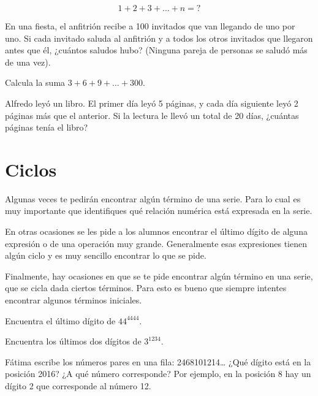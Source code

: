 \[
1+2+3+\dots+n = ?
\]

\begin{exercise}
    En una fiesta, el anfitrión recibe a 100 invitados que van 
    llegando de uno por uno. Si cada invitado saluda al anfitrión 
    y a todos los otros invitados que llegaron antes que él, 
    ¿cuántos saludos hubo? (Ninguna pareja de personas se saludó 
    más de una vez).
\end{exercise}

\begin{exercise}
    Calcula la suma \(3 + 6 + 9 + \dots + 300\).
\end{exercise}

\begin{exercise}
    Alfredo leyó un libro. El primer día leyó 5 páginas, y cada 
    día siguiente leyó 2 páginas más que el anterior. Si la 
    lectura le llevó un total de 20 días, 
    ¿cuántas páginas tenía el libro?
\end{exercise}

\section{Ciclos}

Algunas veces te pedirán encontrar algún término de una serie. Para lo cual es muy importante que identifiques qué relación numérica está expresada en la serie.

En otras ocasiones se les pide a los alumnos encontrar el último dígito de alguna expresión o de una operación muy grande. Generalmente esas expresiones tienen algún ciclo y es muy sencillo encontrar lo que se pide.

Finalmente, hay ocasiones en que se te pide encontrar algún término en una serie, que se cicla dada ciertos términos. Para esto es bueno que siempre intentes encontrar algunos términos iniciales.

\begin{exercise}
    Encuentra el último dígito de \( 44^{4444} \).
\end{exercise}

\begin{exercise}
    Encuentra los últimos dos dígitos de \( 3^{1234} \).
\end{exercise}

\begin{exercise}
    Fátima escribe los números pares en una fila: 2468101214… 
    ¿Qué dígito está en la posición 2016? ¿A qué número 
    corresponde? Por ejemplo, en la posición 8 hay un dígito 2 
    que corresponde al número 12.
\end{exercise}



